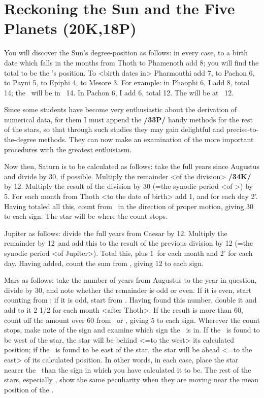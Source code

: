 \section{Reckoning the Sun and the Five Planets (20K,18P)}
You will discover the Sun’s degree-position as follows: in every case, to a birth date which falls in the months from Thoth to Phamenoth add 8\deg; you will find the total to be the \Sun’s position. To <birth dates in> Pharmouthi add 7\deg, to Pachon 6\deg, to Payni 5\deg, to Epiphi 4\deg, to Mesore 3\deg. For example: in Phaophi 6, I add 8\deg, total 14; the \Sun\, will be in \Libra\, 14\deg. In Pachon 6, I add 6\deg, total 12. The \Sun will be at \Taurus\, 12\deg.

Since some students have become very enthusiastic about the derivation of numerical data, for them I must append the \textbf{/33P/} handy methods for the rest of the stars, so that through such studies they may gain delightful and precise-to-the-degree methods. They can now make an examination of the more important procedures with the greatest enthusiasm.

Now then, Saturn is to be calculated as follows: take the full years since Augustus and divide by 30, if possible. Multiply the remainder <of the division> \textbf{/34K/} by 12\deg. Multiply the result of the division by 30 (=the synodic period <of \Saturn>) by 5\deg. For each month from Thoth <to the date of birth> add 1\deg, and for each day 2'. Having totaled all this, count from \Cancer\, in the direction of proper motion, giving 30\deg\, to each sign. The star will be where the count stops.

Jupiter as follows: divide the full years from Caesar by 12. Multiply the remainder by 12\deg\, and add
this to the result of the previous division by 12 (=the synodic period <of Jupiter>). Total this, plus 1\deg\, for each month and 2' for each day. Having added, count the sum from \Taurus, giving 12 to each sign.

Mars as follows: take the number of years from Augustus to the year in question, divide by 30, and note whether the remainder is odd or even. If it is even, start counting from \Aries; if it is odd, start from \Libra. Having found this number, double it and add to it 2 1/2 for each month <after Thoth>. If the result is more than 60, count off the amount over 60 from \Libra\, or \Aries, giving 5 to each sign. Wherever the count stops, make note of the sign and examine which sign the \Sun\, is in. If the \Sun\, is found to be west of the star, the star will be behind <=to the west> its calculated position; if the \Sun\, is found to be east of the star, the star will be ahead <=to the east> of its calculated position. In other words, in each case, place the
star nearer the \Sun\, than the sign in which you have calculated it to be. The rest of the stars, especially \Venus, show the same peculiarity when they are moving near the mean position of the \Sun.

